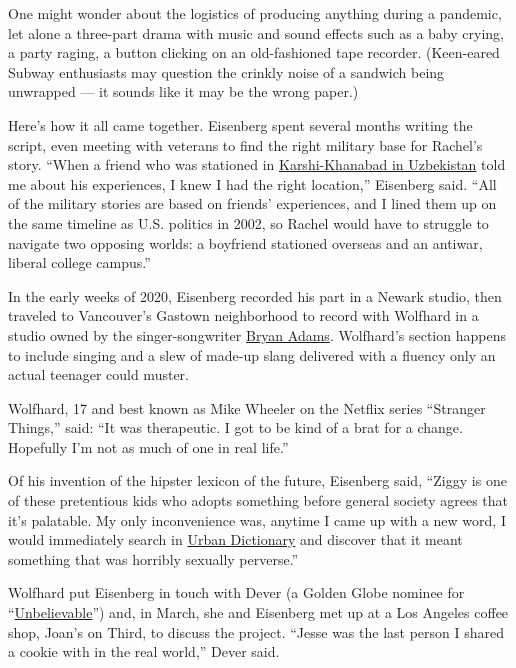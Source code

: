 One might wonder about the logistics of producing anything during a
pandemic, let alone a three-part drama with music and sound effects such
as a baby crying, a party raging, a button clicking on an old-fashioned
tape recorder. (Keen-eared Subway enthusiasts may question the crinkly
noise of a sandwich being unwrapped --- it sounds like it may be the
wrong paper.)

Here's how it all came together. Eisenberg spent several months writing
the script, even meeting with veterans to find the right military base
for Rachel's story. ``When a friend who was stationed in
\href{https://www.nytimes.com/2005/07/31/world/uzbeks-order-us-from-base-in-refugee-rift.html}{Karshi-Khanabad
in Uzbekistan} told me about his experiences, I knew I had the right
location,'' Eisenberg said. ``All of the military stories are based on
friends' experiences, and I lined them up on the same timeline as U.S.
politics in 2002, so Rachel would have to struggle to navigate two
opposing worlds: a boyfriend stationed overseas and an antiwar, liberal
college campus.''

In the early weeks of 2020, Eisenberg recorded his part in a Newark
studio, then traveled to Vancouver's Gastown neighborhood to record with
Wolfhard in a studio owned by the singer-songwriter
\href{https://www.nytimes.com/1994/03/08/arts/review-pop-bryan-adams-more-mr-nice-guy.html}{Bryan
Adams}. Wolfhard's section happens to include singing and a slew of
made-up slang delivered with a fluency only an actual teenager could
muster.

Wolfhard, 17 and best known as Mike Wheeler on the Netflix series
``Stranger Things,'' said: ``It was therapeutic. I got to be kind of a
brat for a change. Hopefully I'm not as much of one in real life.''

Of his invention of the hipster lexicon of the future, Eisenberg said,
``Ziggy is one of these pretentious kids who adopts something before
general society agrees that it's palatable. My only inconvenience was,
anytime I came up with a new word, I would immediately search in
\href{https://www.nytimes.com/2009/07/05/magazine/05FOB-medium-t.html}{Urban
Dictionary} and discover that it meant something that was horribly
sexually perverse.''

Wolfhard put Eisenberg in touch with Dever (a Golden Globe nominee for
``\href{https://www.nytimes.com/2019/09/13/arts/television/review-netflix-unbelievable.html}{Unbelievable}'')
and, in March, she and Eisenberg met up at a Los Angeles coffee shop,
Joan's on Third, to discuss the project. ``Jesse was the last person I
shared a cookie with in the real world,'' Dever said.

